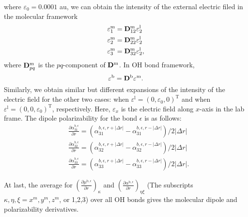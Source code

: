 where $\varepsilon_0 = 0.0001$ au, we can obtain the intensity of the external electric filed in the molecular framework  
\begin{subequations}
  \begin{align}
    &\varepsilon^\text{m}_1 = {\bf D}^{\text{m}}_{12} \varepsilon^\text{l}_2\\
    &\varepsilon^\text{m}_2 = {\bf D}^{\text{m}}_{22} \varepsilon^\text{l}_2\\
    &\varepsilon^\text{m}_3 = {\bf D}^{\text{m}}_{32} \varepsilon^\text{l}_2,
    \end{align}
\end{subequations}
where ${\bf D}^{\text{m}}_{pq}$ is the $pq$-component of ${\bf D}^\text{m}$.
%
In OH bond framework,  
\begin{equation}
  \varepsilon^{\text b} = {\bf D}^{\text b} \varepsilon^{\text{m}}.
\end{equation}
Similarly, we obtain similar but different expansions of the intensity of the electric field for the other two cases: 
when $\varepsilon^{\text{l}} = (0,\varepsilon_0, 0)^\text{T}$ and when $\varepsilon^{\text{l}} = (0,0,\varepsilon_0)^\text{T}$, respectively.
Here, $\varepsilon_x$ is the electric field along $x$-axis in the lab frame. 
    The dipole polarizability for the bond ${\epsilon}$ is as follows:
\begin{subequations}
  \begin{align}
    &\frac{\partial \alpha^{b,\epsilon}_{31}}{\partial r} = (\alpha^{b,\epsilon,r+|\Delta r|}_{31} -\alpha^{b,\epsilon,r-|\Delta r|}_{31})/2|\Delta r|\\
    &\frac{\partial \alpha^{b,\epsilon}_{32}}{\partial r} = (\alpha^{b,\epsilon,r+|\Delta r|}_{32} -\alpha^{b,\epsilon,r-|\Delta r|}_{32})/2|\Delta r|\\
    &\frac{\partial \alpha^{b,\epsilon}_{33}}{\partial r} = (\alpha^{b,\epsilon,r+|\Delta r|}_{33} -\alpha^{b,\epsilon,r-|\Delta r|}_{33})/2|\Delta r|.
  \end{align}
\end{subequations}

At last, the average for $(\frac{\partial \mu^{\text{b},\epsilon}}{\partial r})_\kappa$ and $(\frac{\partial \alpha^{\text{b},\epsilon}}{\partial r})_{\eta\xi}$ 
(The subscripts $\kappa,\eta,\xi = x^m, y^m, z^m$, or 1,2,3) over all OH bonds gives the molecular dipole and polarizability derivatives. 

